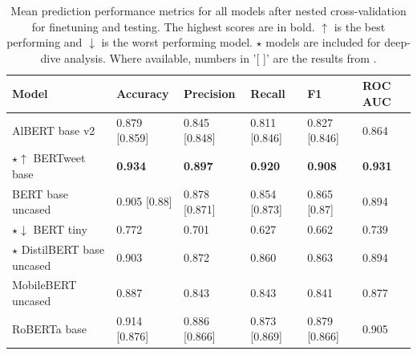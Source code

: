 \begin{table}[htbp]
    \centering
    \small %
    \begin{tabularx}{\textwidth}{|X|X|X|X|X|X|}
        \hline
        \rowcolor[gray]{0.7}
        \textbf{Model}                      & \textbf{Accuracy} & \textbf{Precision} & \textbf{Recall} & \textbf{F1}    & \textbf{ROC AUC} \\
        \hline
        AlBERT base v2                      & 0.879 [0.859]     & 0.845 [0.848]      & 0.811 [0.846]   & 0.827 [0.846]  & 0.864            \\
        \rowcolor[gray]{0.9}
        \(\star\)\(\uparrow\) BERTweet base & \textbf{0.934}    & \textbf{0.897}     & \textbf{0.920}  & \textbf{0.908} & \textbf{0.931}   \\
        BERT base uncased                   & 0.905 [0.88]      & 0.878  [0.871]     & 0.854  [0.873]  & 0.865 [0.87]   & 0.894            \\
        \rowcolor[gray]{0.9}
        \(\star\)\(\downarrow\) BERT tiny   & 0.772             & 0.701              & 0.627           & 0.662          & 0.739            \\
        \(\star\) DistilBERT base uncased   & 0.903             & 0.872              & 0.860           & 0.863          & 0.894            \\
        \rowcolor[gray]{0.9}
        MobileBERT uncased                  & 0.887             & 0.843              & 0.843           & 0.841          & 0.877            \\
        RoBERTa base                        & 0.914 [0.876]     & 0.886 [0.866]      & 0.873 [0.869]   & 0.879 [0.866]  & 0.905            \\
        \hline
    \end{tabularx}
    \caption{Mean prediction performance metrics for all models after nested cross-validation for finetuning and testing. The highest scores are in bold. \(\uparrow\) is the best performing and \(\downarrow\) is the worst performing model. \(\star\) models are included for deep-dive analysis. Where available, numbers in '[ ]' are the results from \cite{jin_complaint_2020}.}
    \label{tab: model_mean_metrics}
\end{table}

